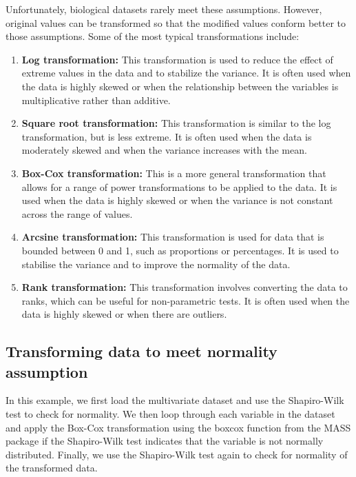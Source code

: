 \documentclass[
]{book}
\providecommand{\tightlist}{%
  \setlength{\itemsep}{0pt}\setlength{\parskip}{0pt}}
\begin{document}
Unfortunately, biological datasets rarely meet these assumptions. However, original values can be transformed so that the modified values conform better to those assumptions. Some of the most typical transformations include:

\begin{enumerate}
\def\labelenumi{\arabic{enumi}.}
\tightlist
\item
  \textbf{Log transformation:} This transformation is used to reduce the effect of extreme values in the data and to stabilize the variance. It is often used when the data is highly skewed or when the relationship between the variables is multiplicative rather than additive.
\item
  \textbf{Square root transformation:} This transformation is similar to the log transformation, but is less extreme. It is often used when the data is moderately skewed and when the variance increases with the mean.
\item
  \textbf{Box-Cox transformation:} This is a more general transformation that allows for a range of power transformations to be applied to the data. It is used when the data is highly skewed or when the variance is not constant across the range of values.
\item
  \textbf{Arcsine transformation:} This transformation is used for data that is bounded between 0 and 1, such as proportions or percentages. It is used to stabilise the variance and to improve the normality of the data.
\item
  \textbf{Rank transformation:} This transformation involves converting the data to ranks, which can be useful for non-parametric tests. It is often used when the data is highly skewed or when there are outliers.
\end{enumerate}

\hypertarget{transforming-data-to-meet-normality-assumption}{%
\subsection*{Transforming data to meet normality assumption}\label{transforming-data-to-meet-normality-assumption}}

In this example, we first load the multivariate dataset and use the Shapiro-Wilk test to check for normality. We then loop through each variable in the dataset and apply the Box-Cox transformation using the boxcox function from the MASS package if the Shapiro-Wilk test indicates that the variable is not normally distributed. Finally, we use the Shapiro-Wilk test again to check for normality of the transformed data.
\end{document}
